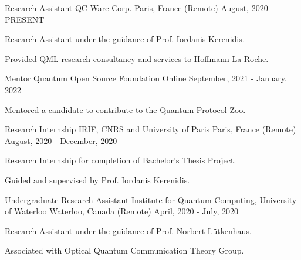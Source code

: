 

\begin{cventries}

  \cventry
    {Research Assistant} %
    {QC Ware Corp.} %
    {Paris, France (Remote)} %
    {August, 2020 - PRESENT} %
    {
      \begin{cvitems} %
        \item {Research Assistant under the guidance of Prof. Iordanis Kerenidis.}
        \item {Provided QML research consultancy and services to Hoffmann-La Roche.}
      \end{cvitems}
    }

  \cventry
    {Mentor} %
    {Quantum Open Source Foundation} %
    {Online} %
    {September, 2021 - January, 2022} %
    {
      \begin{cvitems} %
        \item {Mentored a candidate to contribute to the Quantum Protocol Zoo.}
      \end{cvitems}
    }

  \cventry
    {Research Internship} %
    {IRIF, CNRS and  University of Paris} %
    {Paris, France (Remote)} %
    {August, 2020 - December, 2020} %
    {
      \begin{cvitems} %
        \item {Research Internship for completion of Bachelor's Thesis Project.}
        \item {Guided and supervised by Prof. Iordanis Kerenidis.}
      \end{cvitems}
    }

  \cventry
    {Undergraduate Research Assistant} %
    {Institute for Quantum Computing, University of Waterloo} %
    {Waterloo, Canada (Remote)} %
    {April, 2020 - July, 2020} %
    {
      \begin{cvitems} %
        \item {Research Assistant under the guidance of Prof. Norbert Lütkenhaus.}
        \item {Associated with Optical Quantum Communication Theory Group.}
      \end{cvitems}
    }


\end{cventries}
